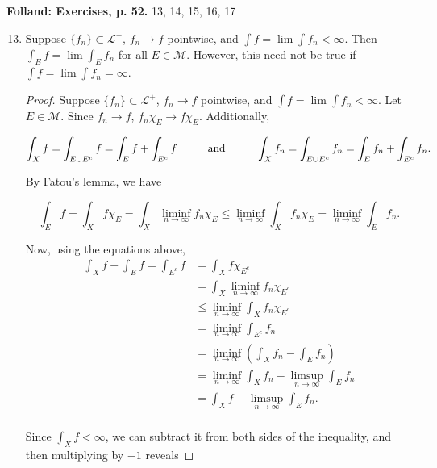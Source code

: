 \documentclass[11pt,oneside,english]{amsart}
\theoremstyle{definition}
\newcommand{\pspace}{\hspace{10mm}}
\newcommand{\MC}[1]{\mathcal{#1}}
\begin{document}
\rightline{\today}

\vspace{-5mm}
\textbf{Folland: Exercises, p. 52.} 13, 14, 15, 16, 17

\vspace{5mm}
\begin{enumerate}
\setcounter{enumi}{12}

\item Suppose $\{f_n\}\subset\MC{L}^+$, $f_n\rightarrow f$ pointwise, and $\int f=\lim \int f_n<\infty$. Then $\int_E f=\lim \int_E f_n$ for all $E\in\MC{M}$. However, this need not be true if $\int f=\lim \int f_n=\infty$.

\begin{proof}
Suppose $\{f_n\}\subset\MC{L}^+$, $f_n\rightarrow f$ pointwise, and $\int f=\lim \int f_n<\infty$. Let $E\in\MC{M}$. Since $f_n\rightarrow f$, $f_n\chi_E\rightarrow f\chi_E$. Additionally, 

\[
\int_X f=\int_{E\cup E^c}f=\int_E f+\int_{E^c} f\pspace\text{and}\pspace \int_X f_n=\int_{E\cup E^c}f_n=\int_E f_n +\int_{E^c} f_n.
\]

By Fatou's lemma, we have

\[
\int_E f=\int_X f\chi_E=\int_X\liminf_{n\rightarrow\infty} f_n\chi_E\leq \liminf_{n\rightarrow\infty}\int_X f_n\chi_E=\liminf_{n\rightarrow\infty}\int_E f_n.
\]

\vspace{-5mm}
Now, using the equations above,
\begin{align*}
\int_X f-\int_E f=\int_{E^c}f&=\int_{X}f\chi_{E^c}\\[2mm]
&=\int_X\liminf_{n\rightarrow\infty}f_n\chi_{E^c}\\[2mm]
&\leq\liminf_{n\rightarrow\infty}\int_Xf_n\chi_{E^c}\\[2mm]
&=\liminf_{n\rightarrow\infty}\int_{E^c} f_n\\[2mm]
&=\liminf_{n\rightarrow\infty}\left(\int_X f_n-\int_{E}f_n\right)\\[2mm]
&=\liminf_{n\rightarrow\infty}\int_X f_n-\limsup_{n\rightarrow\infty}\int_{E} f_n\\[2mm]
&=\int_X f-\limsup_{n\rightarrow\infty}\int_{E} f_n.\\[2mm]
\end{align*}

Since $\int_X f<\infty$, we can subtract it from both sides of the inequality, and then multiplying by $-1$ reveals


\end{proof}
\end{enumerate}
\end{document}
